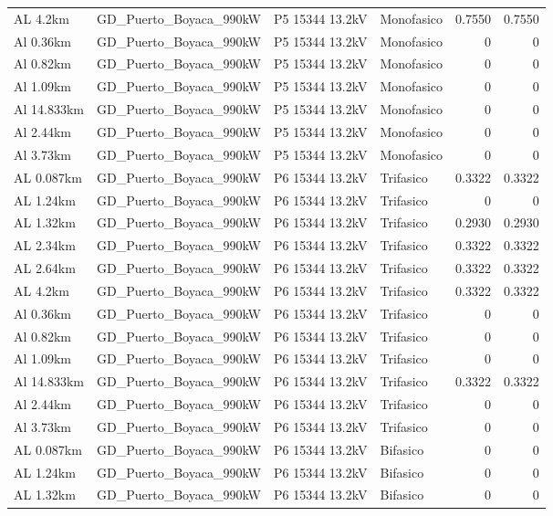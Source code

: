 \documentclass[11pt,a4paper]{article}
\begin{document}
\begin{longtable}{llllrr}
AL 4.2km & GD\_Puerto\_Boyaca\_990kW & P5 15344 13.2kV & Monofasico & 0.7550 & 0.7550 \\
Al 0.36km & GD\_Puerto\_Boyaca\_990kW & P5 15344 13.2kV & Monofasico & 0 & 0 \\
Al 0.82km & GD\_Puerto\_Boyaca\_990kW & P5 15344 13.2kV & Monofasico & 0 & 0 \\
Al 1.09km & GD\_Puerto\_Boyaca\_990kW & P5 15344 13.2kV & Monofasico & 0 & 0 \\
Al 14.833km & GD\_Puerto\_Boyaca\_990kW & P5 15344 13.2kV & Monofasico & 0 & 0 \\
Al 2.44km & GD\_Puerto\_Boyaca\_990kW & P5 15344 13.2kV & Monofasico & 0 & 0 \\
Al 3.73km & GD\_Puerto\_Boyaca\_990kW & P5 15344 13.2kV & Monofasico & 0 & 0 \\
AL 0.087km & GD\_Puerto\_Boyaca\_990kW & P6 15344 13.2kV & Trifasico & 0.3322 & 0.3322 \\
AL 1.24km & GD\_Puerto\_Boyaca\_990kW & P6 15344 13.2kV & Trifasico & 0 & 0 \\
AL 1.32km & GD\_Puerto\_Boyaca\_990kW & P6 15344 13.2kV & Trifasico & 0.2930 & 0.2930 \\
AL 2.34km & GD\_Puerto\_Boyaca\_990kW & P6 15344 13.2kV & Trifasico & 0.3322 & 0.3322 \\
AL 2.64km & GD\_Puerto\_Boyaca\_990kW & P6 15344 13.2kV & Trifasico & 0.3322 & 0.3322 \\
AL 4.2km & GD\_Puerto\_Boyaca\_990kW & P6 15344 13.2kV & Trifasico & 0.3322 & 0.3322 \\
Al 0.36km & GD\_Puerto\_Boyaca\_990kW & P6 15344 13.2kV & Trifasico & 0 & 0 \\
Al 0.82km & GD\_Puerto\_Boyaca\_990kW & P6 15344 13.2kV & Trifasico & 0 & 0 \\
Al 1.09km & GD\_Puerto\_Boyaca\_990kW & P6 15344 13.2kV & Trifasico & 0 & 0 \\
Al 14.833km & GD\_Puerto\_Boyaca\_990kW & P6 15344 13.2kV & Trifasico & 0.3322 & 0.3322 \\
Al 2.44km & GD\_Puerto\_Boyaca\_990kW & P6 15344 13.2kV & Trifasico & 0 & 0 \\
Al 3.73km & GD\_Puerto\_Boyaca\_990kW & P6 15344 13.2kV & Trifasico & 0 & 0 \\
AL 0.087km & GD\_Puerto\_Boyaca\_990kW & P6 15344 13.2kV & Bifasico & 0 & 0 \\
AL 1.24km & GD\_Puerto\_Boyaca\_990kW & P6 15344 13.2kV & Bifasico & 0 & 0 \\
AL 1.32km & GD\_Puerto\_Boyaca\_990kW & P6 15344 13.2kV & Bifasico & 0 & 0 \\

\end{longtable}
\end{document}
